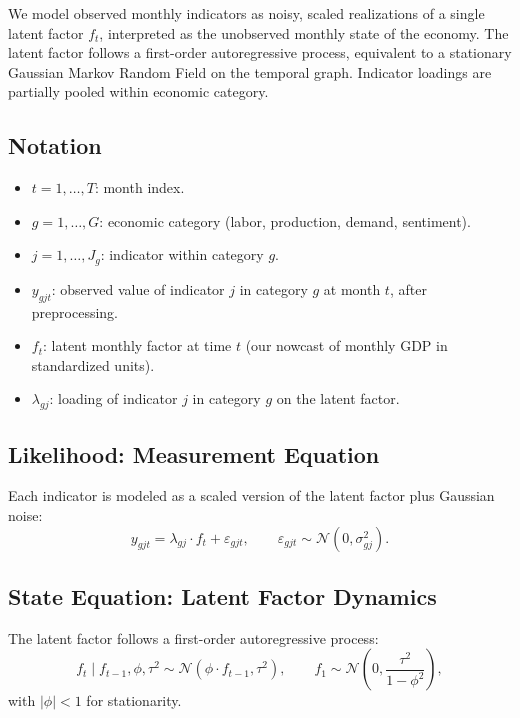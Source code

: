 \documentclass[11pt]{article}
\begin{document}
We model observed monthly indicators as noisy, scaled realizations of a single latent factor $f_t$, interpreted as the unobserved monthly state of the economy. The latent factor follows a first-order autoregressive process, equivalent to a stationary Gaussian Markov Random Field on the temporal graph. Indicator loadings are partially pooled within economic category.

\subsection{Notation}

\begin{itemize}[nosep]
  \item $t = 1, \dots, T$: month index.
  \item $g = 1, \dots, G$: economic category (labor, production, demand, sentiment).
  \item $j = 1, \dots, J_g$: indicator within category $g$.
  \item $y_{gjt}$: observed value of indicator $j$ in category $g$ at month $t$, after preprocessing.
  \item $f_t$: latent monthly factor at time $t$ (our nowcast of monthly GDP in standardized units).
  \item $\lambda_{gj}$: loading of indicator $j$ in category $g$ on the latent factor.
\end{itemize}

\subsection{Likelihood: Measurement Equation}

Each indicator is modeled as a scaled version of the latent factor plus Gaussian noise:
\begin{equation}
y_{gjt} = \lambda_{gj} \cdot f_t + \varepsilon_{gjt}, \qquad \varepsilon_{gjt} \sim \mathcal{N}(0, \sigma_{gj}^2).
\end{equation}

\subsection{State Equation: Latent Factor Dynamics}

The latent factor follows a first-order autoregressive process:
\begin{equation}
f_t \mid f_{t-1}, \phi, \tau^2 \sim \mathcal{N}(\phi \cdot f_{t-1}, \tau^2), \qquad f_1 \sim \mathcal{N}\left(0, \frac{\tau^2}{1 - \phi^2}\right),
\end{equation}
with $|\phi| < 1$ for stationarity.
\end{document}
